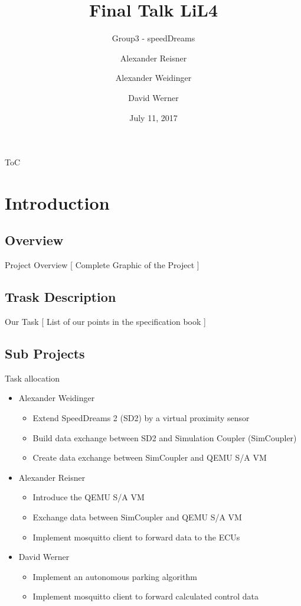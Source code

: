 \documentclass{beamer}
\title{Final Talk LiL4}
\subtitle{Group3 - speedDreams}
\date{July 11, 2017}
\author{Alexander Reisner \and
Alexander Weidinger \and
David Werner}
\institute{Technische Universität München}
\begin{document}
  \renewcommand{\figurename}{\tiny Fig.}
  \maketitle

  \begin{frame}{ToC}
    \tableofcontents
  \end{frame}

  \section{Introduction}
  \subsection{Overview}
  \begin{frame}{Project Overview}
    [ Complete Graphic of the Project ]
  \end{frame}

  \subsection{Trask Description}
  \begin{frame}{Our Task}
    [ List of our points in the specification book ]
  \end{frame}

  \subsection{Sub Projects}
  \begin{frame}{Task allocation}
    \begin{itemize}
      \item Alexander Weidinger
      \begin{itemize}
        \item Extend SpeedDreams 2 (SD2) by a virtual proximity sensor
        \item Build data exchange between SD2 and Simulation Coupler (SimCoupler)
        \item Create data exchange between SimCoupler and QEMU S/A VM
      \end{itemize}
      \item Alexander Reisner
      \begin{itemize}
        \item Introduce the QEMU S/A VM
        \item Exchange data between SimCoupler and QEMU S/A VM
        \item Implement mosquitto client to forward data to the ECUs
      \end{itemize}
      \item David Werner
      \begin{itemize}
        \item Implement an autonomous parking algorithm
        \item Implement mosquitto client to forward calculated control data
      \end{itemize}
    \end{itemize}
  \end{frame}
\end{document}
